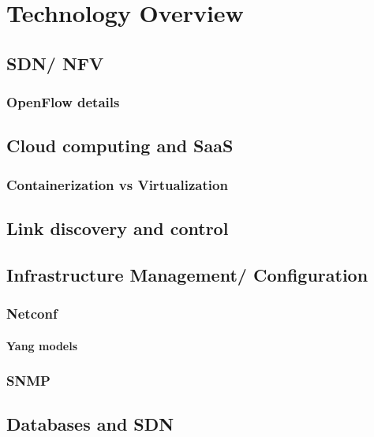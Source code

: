 \chapter{Technology Overview} \label{chap:tech} %

\section {SDN/ NFV}
\subsection {OpenFlow details}
\section {Cloud computing and SaaS}
\subsection {Containerization vs Virtualization}
\section {Link discovery and control}
\section {Infrastructure Management/ Configuration}
\subsection {Netconf}
\subsubsection {Yang models}
\subsection {SNMP}
\section {Databases and SDN} %


